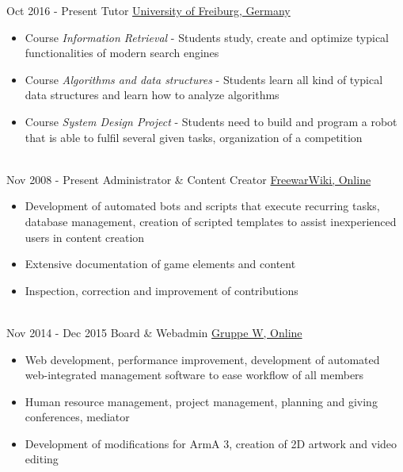 \documentclass[letterpaper]{twentysecondcv} %
\begin{document}
\begin{twenty} %
     	\twentyitem
    		{Oct 2016 -}
		{Present}
        		{Tutor}
        		{\href{https://www.uni-freiburg.de/}{University of Freiburg, Germany}}
        		{}
        		{\begin{itemize}
        			\item Course \textit{Information Retrieval} - Students study, create and optimize typical
        				functionalities of modern search engines
        			\item Course \textit{Algorithms and data structures} - Students learn all kind of typical data
        				structures and learn how to analyze algorithms
        			\item Course \textit{System Design Project} - Students need to build and program a robot that is
        				able to fulfil several given tasks, organization of a competition
        		\end{itemize}}\\
     	\twentyitem
    		{Nov 2008 -}
		{Present}
        		{Administrator \& Content Creator}
        		{\href{http://www.fwwiki.de/}{FreewarWiki, Online}}
        		{}
        		{\begin{itemize}
        			\item Development of automated bots and scripts that execute recurring tasks, database management,
        				creation of scripted templates to assist inexperienced users in content creation
        			\item Extensive documentation of game elements and content
        			\item Inspection, correction and improvement of contributions
        		\end{itemize}}\\
	\twentyitem
    		{Nov 2014 -}
		{Dec 2015}
        		{Board \& Webadmin}
        		{\href{https://www.gruppe-w.de/}{Gruppe W, Online}}
        		{}
        		{\begin{itemize}
        			\item Web development, performance improvement, development of automated web-integrated
        				management software to ease workflow of all members
			\item Human resource management, project management, planning and giving conferences, mediator
        			\item Development of modifications for ArmA 3, creation of 2D artwork and video editing
        		\end{itemize}}\\

\end{twenty}
\end{document}
